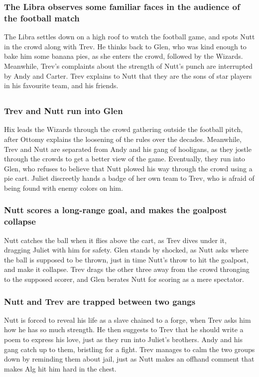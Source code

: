 \subsubsection{The \Gls{Libra} observes some familiar faces in the audience of the football match}
The \Gls{Libra} settles down on a high roof to watch the football game, and spots \Gls{Nutt} in
the crowd along with \Gls{Trev}. He thinks back to \Gls{Glen}, who was kind enough to bake him some
banana pies, as she enters the crowd, followed by the Wizards. Meanwhile, \Gls{Trev}'s complaints
about the strength of \Gls{Nutt}'s punch are interrupted by \Gls{Andy} and \Gls{Carter}. \Gls{Trev}
explains to \Gls{Nutt} that they are the sons of star players in his favourite team, and his
friends.

\subsection{}
\subsubsection{\Gls{Trev} and \Gls{Nutt} run into \Gls{Glen}}
\Gls{Hix} leads the Wizards through the crowd gathering outside the football pitch, after
\Gls{Ottomy} explains the loosening of the rules over the decades. Meanwhile, \Gls{Trev} and
\Gls{Nutt} are separated from \Gls{Andy} and his gang of hooligans, as they jostle through the
crowds to get a better view of the game. Eventually, they run into \Gls{Glen}, who refuses to
believe that \Gls{Nutt} plowed his way through the crowd using a pie cart. \Gls{Juliet} discreetly
hands a badge of her own team to \Gls{Trev}, who is afraid of being found with enemy colors on him.

\subsubsection{\Gls{Nutt} scores a long-range goal, and makes the goalpost collapse}
\Gls{Nutt} catches the ball when it flies above the cart, as \Gls{Trev} dives under it, dragging
\Gls{Juliet} with him for safety. \Gls{Glen} stands by shocked, as \Gls{Nutt} asks where the ball
is supposed to be thrown, just in time \Gls{Nutt}'s throw to hit the goalpost, and make it collapse.
\Gls{Trev} drags the other three away from the crowd thronging to the supposed scorer, and
\Gls{Glen} berates \Gls{Nutt} for scoring as a mere spectator.

\subsubsection{\Gls{Nutt} and \Gls{Trev} are trapped between two gangs}
\Gls{Nutt} is forced to reveal his life as a slave chained to a forge, when \Gls{Trev} asks him how
he has so much strength. He then suggests to \Gls{Trev} that he should write a poem to express his
love, just as they run into \Gls{Juliet}'s brothers. \Gls{Andy} and his gang catch up to them,
bristling for a fight. \Gls{Trev} manages to calm the two groups down by reminding them about jail,
just as \Gls{Nutt} makes an offhand comment that makes \Gls{Alg} hit him hard in the chest.


